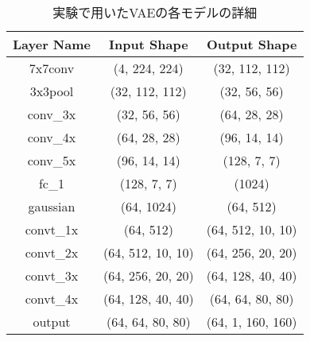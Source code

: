 \begin{table*}[htbp]
\caption{実験で用いたVAEの各モデルの詳細}
\begin{tabular}{ccc}
\hline \hline
Layer Name                & Input Shape       & Output Shape              \\ \hline \hline
7x7conv                  & (4, 224, 224) & (32, 112, 112)   \\
3x3pool                  & (32, 112, 112)  & (32, 56, 56)  \\
conv\_3x                  & (32, 56, 56) & (64, 28, 28)  \\
conv\_4x                  & (64, 28, 28) & (96, 14, 14)  \\
conv\_5x                  & (96, 14, 14) & (128, 7, 7)  \\
fc\_1                   & (128, 7, 7) & (1024)        \\
gaussian                  & (64, 1024)        & (64, 512)          \\
convt\_1x                 & (64, 512)         & (64, 512, 10, 10)  \\
convt\_2x                 & (64, 512, 10, 10) & (64, 256, 20, 20)  \\
convt\_3x                 & (64, 256, 20, 20) & (64, 128, 40, 40)  \\
convt\_4x                 & (64, 128, 40, 40) & (64, 64, 80, 80)   \\
output                    & (64, 64, 80, 80)  & (64, 1, 160, 160) \\
\end{tabular}
\label{table:vae_arch}
\end{table*}
